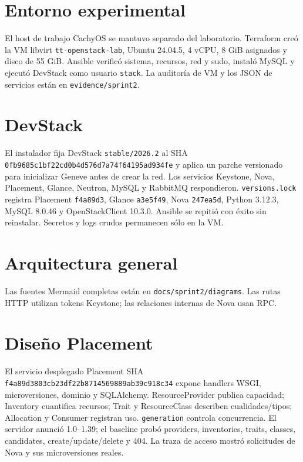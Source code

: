 \documentclass[10pt,a4paper]{article}
\begin{document}
\section{Entorno experimental}
El host de trabajo CachyOS se mantuvo separado del laboratorio. Terraform creó la VM libvirt \texttt{tt-openstack-lab}, Ubuntu 24.04.5, 4 vCPU, 8 GiB asignados y disco de 55 GiB. Ansible verificó sistema, recursos, red y sudo, instaló MySQL y ejecutó DevStack como usuario \texttt{stack}. La auditoría de VM y los JSON de servicios están en \texttt{evidence/sprint2}.

\section{DevStack}
El instalador fija DevStack \texttt{stable/2026.2} al SHA \texttt{0fb9685c1bf22cd0b4d576d7a74f64195ad934fe} y aplica un parche versionado para inicializar Geneve antes de crear la red. Los servicios Keystone, Nova, Placement, Glance, Neutron, MySQL y RabbitMQ respondieron. \texttt{versions.lock} registra Placement \texttt{f4a89d3}, Glance \texttt{a3e5f49}, Nova \texttt{247ea5d}, Python 3.12.3, MySQL 8.0.46 y OpenStackClient 10.3.0. Ansible se repitió con éxito sin reinstalar. Secretos y logs crudos permanecen sólo en la VM.

\section{Arquitectura general}
\begin{center}
\end{center}
Las fuentes Mermaid completas están en \texttt{docs/sprint2/diagrams}. Las rutas HTTP utilizan tokens Keystone; las relaciones internas de Nova usan RPC.

\section{Diseño Placement}
El servicio desplegado Placement SHA \texttt{f4a89d3803cb23df22b8714569889ab39c918c34} expone handlers WSGI, microversiones, dominio y SQLAlchemy. ResourceProvider publica capacidad; Inventory cuantifica recursos; Trait y ResourceClass describen cualidades/tipos; Allocation y Consumer registran uso. \texttt{generation} controla concurrencia. El servidor anunció 1.0--1.39; el baseline probó providers, inventories, traits, classes, candidates, create/update/delete y 404. La traza de acceso mostró solicitudes de Nova y sus microversiones reales.
\end{document}
